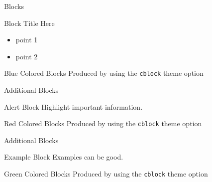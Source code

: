 \documentclass[newPxFont, numfooter, sectionpages]{beamer}
\begin{document}

\begin{frame}{Blocks}

\begin{block}{Block Title Here}
	\begin{itemize}
		\item point 1
		\item point 2
	\end{itemize}
\end{block}

\begingroup
{}
\begin{block}{Blue Colored Blocks}
	Produced by using the \texttt{cblock} theme option
\end{block}
\endgroup
\end{frame}


\begin{frame}{Additional Blocks}
\begin{alertblock}{Alert Block}
	Highlight important information.
\end{alertblock}

\begingroup
{}
\begin{block}{Red Colored Blocks}
	Produced by using the \texttt{cblock} theme option
\end{block}
\endgroup
\end{frame}


\begin{frame}{Additional Blocks}

\begin{exampleblock}{Example Block}
	Examples can be good.
\end{exampleblock}

\begingroup
{}
\begin{block}{Green Colored Blocks}
	Produced by using the \texttt{cblock} theme option
\end{block}
\endgroup

\end{frame}
\end{document}
